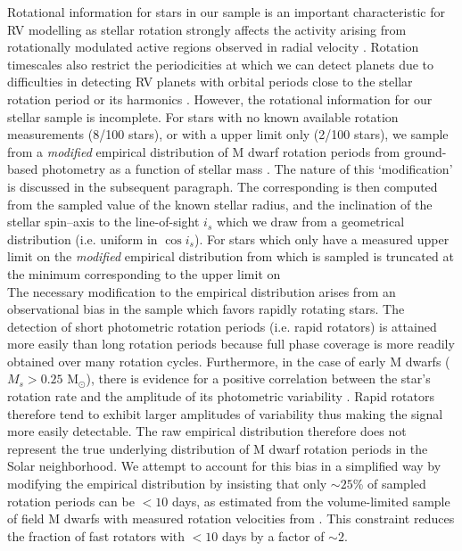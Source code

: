 Rotational information for stars in our sample is an important characteristic for RV modelling
as stellar rotation strongly affects the activity arising from rotationally modulated active
regions observed in radial velocity \citep{saar97, meunier10, aigrain12, dumusque14}.
Rotation timescales also restrict the periodicities at which we can detect planets
due to difficulties in detecting RV planets with 
orbital periods close to the stellar rotation period or its harmonics \citep{vanderburg16}. 
However, the rotational information for our stellar sample is incomplete.
For stars with no known available rotation measurements (8/100 stars),
or with a \vsini{} upper limit only (2/100 stars),
we sample \prot{} from a \emph{modified} empirical distribution of M dwarf
rotation periods from ground-based photometry as a function of stellar mass
\citep{newton16a}. The nature of this `modification' is discussed in the subsequent
paragraph. The corresponding \vsini{} is then computed
from the sampled value of \prot{,} the known stellar radius, and the
inclination of the stellar spin--axis to the line-of-sight $i_s$ which we
draw from a geometrical distribution (i.e. uniform in $\cos{i_s}$).
For stars which only have a measured upper limit on \vsini{,} 
the \emph{modified} empirical distribution from which \prot{} is sampled is
truncated at the minimum \prot{} corresponding to the upper limit on  \\

The necessary modification to the empirical \prot{} distribution arises from
an observational bias in the \cite{newton16a} sample which favors rapidly rotating stars.
The detection of short photometric rotation periods (i.e. rapid rotators) is attained more
easily than long rotation periods because full phase coverage is more readily obtained over many
rotation cycles. Furthermore, in the case of early M dwarfs ($M_s > 0.25$ M$_{\odot}$), 
there is evidence for a positive correlation between the star's rotation rate and the
amplitude of its photometric variability \citep{newton16a}. Rapid rotators therefore
tend to exhibit larger amplitudes of variability thus making the signal more easily detectable.
The raw empirical distribution therefore does not represent the true underlying distribution of M
dwarf rotation periods in the Solar neighborhood. We attempt to account for this bias in a simplified
way by modifying the empirical \prot{} distribution by insisting that only
$\sim 25$\% of sampled rotation periods can be $<10$ days, as estimated from the volume-limited sample
of field M dwarfs with measured rotation velocities from \cite{delfosse98}. This constraint
reduces the fraction of fast rotators with \prot{} $< 10$ days by a factor of $\sim 2$. \\

